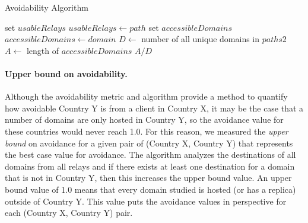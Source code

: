 \begin{algorithm}[t]
\caption{Avoidability Algorithm}
\label{avoid_algo}
\small
\begin{algorithmic}[1]
    \State set $usableRelays$
		\State $usableRelays \gets path$
	\EndIf
    \EndFor
    \State set $accessibleDomains$
        \State $accessibleDomains \gets domain$
        \EndIf
    \EndIf
    \EndFor
    \State $D \gets$ number of all unique domains in $paths2$
    \State $A \gets$ length of $accessibleDomains$
    \State \Return $A / D$
\EndFunction
\end{algorithmic}
\end{algorithm}


\paragraph{Upper bound on avoidability.}  Although the avoidability
metric and algorithm provide a method to quantify how avoidable Country
Y is from a client in Country X, it may be the case that a number of
domains are only hosted in Country Y, so the avoidance value for these
countries would never reach 1.0.  For this reason, we measured the {\em upper
bound} on avoidance for a given pair of (Country X, Country Y) that
represents the best case value for avoidance.  The algorithm analyzes the destinations of all domains from all relays and if there exists at least one destination for a domain that is not in Country Y, then this increases the upper bound value.  An upper bound value of 1.0 means that every domain studied is hosted (or has a replica) outside of Country Y.  This value puts the avoidance values in perspective for each (Country X, Country Y) pair. 


